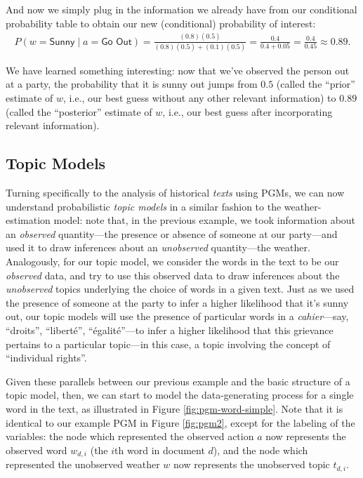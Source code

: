 \documentclass[11pt]{article}
\begin{document}
And now we simply plug in the information we already have from our conditional probability table to obtain our new (conditional) probability of interest:
\begin{align*}
	P(w = \textsf{Sunny} \; | \; a = \textsf{Go Out}) = \frac{(0.8)(0.5)}{(0.8)(0.5) + (0.1)(0.5)} = \frac{0.4}{0.4 + 0.05} = \frac{0.4}{0.45} \approx 0.89.
\end{align*}

We have learned something interesting: now that we've observed the person out at a party, the probability that it is sunny out jumps from $0.5$ (called the ``prior'' estimate of $w$, i.e., our best guess without any other relevant information) to $0.89$ (called the ``posterior'' estimate of $w$, i.e., our best guess after incorporating relevant information).

\subsection{Topic Models}\label{sec:topic-models}


Turning specifically to the analysis of historical \textit{texts} using PGMs, we can now understand probabilistic \textit{topic models} in a similar fashion to the weather-estimation model: note that, in the previous example, we took information about an \textit{observed} quantity---the presence or absence of someone at our party---and used it to draw inferences about an \textit{unobserved} quantity---the weather. Analogously, for our topic model, we consider the words in the text to be our \textit{observed} data, and try to use this observed data to draw inferences about the \textit{unobserved} topics underlying the choice of words in a given text. Just as we used the presence of someone at the party to infer a higher likelihood that it's sunny out, our topic models will use the presence of particular words in a \textit{cahier}---say, ``droits'', ``liberté'', ``égalité''---to infer a higher likelihood that this grievance pertains to a particular topic---in this case, a topic involving the concept of ``individual rights''.

Given these parallels between our previous example and the basic structure of a topic model, then, we can start to model the data-generating process for a single word in the text, as illustrated in Figure \ref{fig:pgm-word-simple}. Note that it is identical to our example PGM in Figure \ref{fig:pgm2}, except for the labeling of the variables: the node which represented the observed action $a$ now represents the observed word $w_{d,i}$ (the $i$th word in document $d$), and the node which represented the unobserved weather $w$ now represents the unobserved topic $t_{d,i}$.
\end{document}
